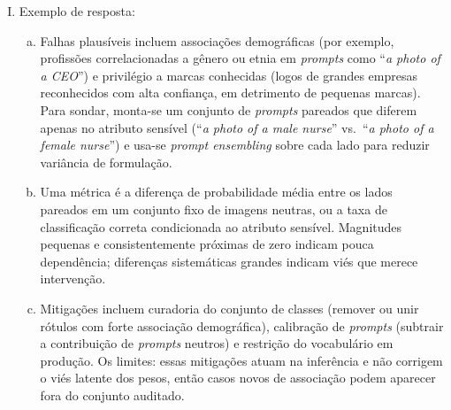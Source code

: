 \documentclass{dlproblemset}
\begin{document}
\begin{enumerate}[I)]
    \item
    Exemplo de resposta:
    \begin{enumerate}[(a)]
        \item Falhas plausíveis incluem associações demográficas (por exemplo, profissões correlacionadas a gênero ou etnia em \textit{prompts} como ``\textit{a photo of a CEO}'') e privilégio a marcas conhecidas (logos de grandes empresas reconhecidos com alta confiança, em detrimento de pequenas marcas). Para sondar, monta-se um conjunto de \textit{prompts} pareados que diferem apenas no atributo sensível (``\textit{a photo of a male nurse}'' vs.\ ``\textit{a photo of a female nurse}'') e usa-se \textit{prompt ensembling} sobre cada lado para reduzir variância de formulação.
        \item Uma métrica é a diferença de probabilidade média entre os lados pareados em um conjunto fixo de imagens neutras, ou a taxa de classificação correta condicionada ao atributo sensível. Magnitudes pequenas e consistentemente próximas de zero indicam pouca dependência; diferenças sistemáticas grandes indicam viés que merece intervenção.
        \item Mitigações incluem curadoria do conjunto de classes (remover ou unir rótulos com forte associação demográfica), calibração de \textit{prompts} (subtrair a contribuição de \textit{prompts} neutros) e restrição do vocabulário em produção. Os limites: essas mitigações atuam na inferência e não corrigem o viés latente dos pesos, então casos novos de associação podem aparecer fora do conjunto auditado.
    \end{enumerate}
\end{enumerate}

\color{black}
\end{document}

